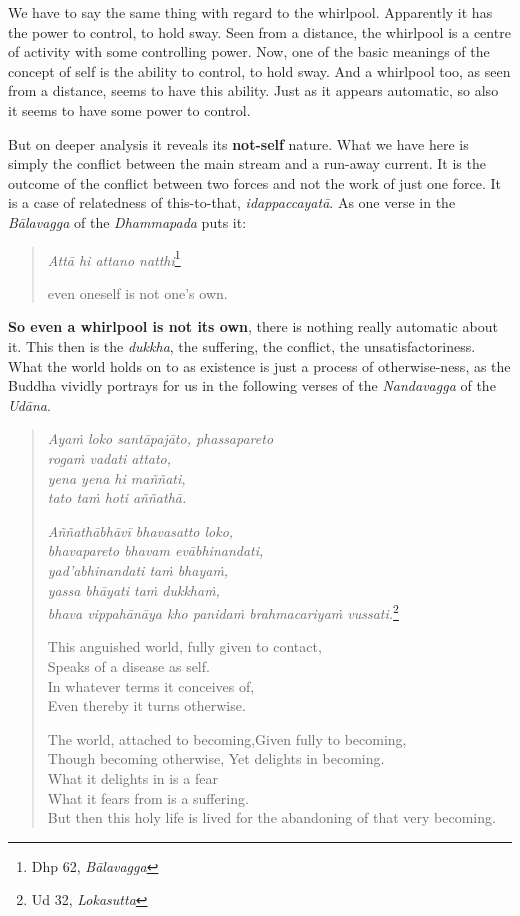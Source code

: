 We have to say the same thing with regard to the whirlpool. Apparently it has the power to control, to hold sway. Seen from a distance, the whirlpool is a centre of activity with some controlling power. Now, one of the basic meanings of the concept of self is the ability to control, to hold sway. And a whirlpool too, as seen from a distance, seems to have this ability. Just as it appears automatic, so also it seems to have some power to control.

But on deeper analysis it reveals its \textbf{not-self} nature. What we have here is simply the conflict between the main stream and a run-away current. It is the outcome of the conflict between two forces and not the work of just one force. It is a case of relatedness of this-to-that, \emph{idappaccayatā}. As one verse in the \emph{Bālavagga} of the \emph{Dhammapada} puts it:

\begin{quote}
\emph{Attā hi attano natthi}\footnote{Dhp 62, \emph{Bālavagga}}

even oneself is not one's own.
\end{quote}

\textbf{So even a whirlpool is not its own}, there is nothing really automatic about it. This then is the \emph{dukkha}, the suffering, the conflict, the unsatisfactoriness. What the world holds on to as existence is just a process of otherwise-ness, as the Buddha vividly portrays for us in the following verses of the \emph{Nandavagga} of the \emph{Udāna}.

\enlargethispage{\baselineskip}

\begin{quote}
\emph{Ayaṁ loko santāpajāto, phassapareto}\\
\emph{rogaṁ vadati attato,}\\
\emph{yena yena hi maññati,}\\
\emph{tato taṁ hoti aññathā.}

\emph{Aññathābhāvī bhavasatto loko,}\\
\emph{bhavapareto bhavam evābhinandati,}\\
\emph{yad'abhinandati taṁ bhayaṁ,}\\
\emph{yassa bhāyati taṁ dukkhaṁ,}\\
\emph{bhava vippahānāya kho panidaṁ brahmacariyaṁ vussati.}\footnote{Ud 32, \emph{Lokasutta}}

This anguished world, fully given to contact,\\
Speaks of a disease as self.\\
In whatever terms it conceives of,\\
Even thereby it turns otherwise.

The world, attached to becoming,Given fully to becoming,\\
Though becoming otherwise, Yet delights in becoming.\\
What it delights in is a fear\\
What it fears from is a suffering.\\
But then this holy life is lived for the abandoning of that very becoming.
\end{quote}


